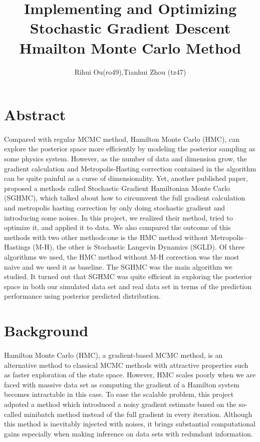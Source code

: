 \documentclass[11pt]{article}
\title{Implementing and Optimizing Stochastic Gradient Descent Hmailton Monte Carlo Method}
\author{Rihui Ou(ro49),Tianhui Zhou
(tz47) }
\begin{document}
\maketitle

\section{Abstract}
\paragraph{}
Compared with regular MCMC method, Hamilton Monte Carlo (HMC), can explore the posterior space more efficiently by modeling the posterior sampling as some physics system. However, as the number of data and dimension grow, the gradient calculation and Metropolis-Hasting correction contained in the algorithm can be quite painful as a curse of dimensionality. Yet, another published paper\cite{chen2014stochastic}, proposed a methods called Stochastic Gradient Hamiltonian Monte Carlo (SGHMC), which talked about how to circumvent the full gradient calculation and metropolis hasting correction by only doing stochastic gradient and introducing some noises. In this project, we realized their method, tried to optimize it, and applied it to data. We also compared the outcome of this methods with two other methods:one is the HMC method without Metropolis–Hastings (M-H), the other is Stochastic Langevin Dynamics (SGLD). Of three algorithms we used, the HMC method without M-H correction was the most naive and we used it as baseline. The SGHMC was the main algorithm we studied. It turned out that SGHMC was quite efficient in exploring the posterior space in both our simulated data set and real data set in terms of the prediction performance using posterior predicted distribution.

\section{Background}
\paragraph{}
Hamilton Monte Carlo (HMC), a gradient-based MCMC method, is an alternative method to classical MCMC methods with attractive properties such as faster exploration of the state space. However, HMC scales poorly when we are faced with massive data set as computing the gradient of a Hamilton system becomes intractable in this case. To ease the scalable problem, this project adpoted a method which introduced a noisy gradient estimate based on the so-called minibatch method instead of the full gradient in every iteration\cite{chen2014stochastic}. Although this method is inevitably injected with noises, it brings substantial computational gains especially when making inference on data sets with redundant information.
\end{document}
